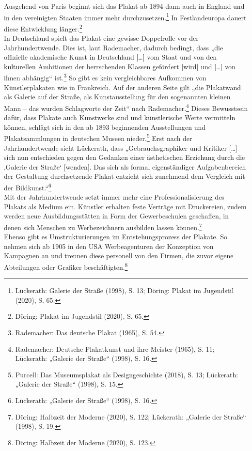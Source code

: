 \documentclass[a4paper,12pt,ngerman]{article}
\begin{document}
Ausgehend von Paris beginnt sich das Plakat ab 1894 dann auch in England und in den vereinigten Staaten immer mehr durchzusetzen.\footnote{Lückerath: Galerie der Straße (1998), S. 13; Döring: Plakat im Jugendstil (2020), S. 65.}  In Festlandeuropa dauert diese Entwicklung länger.\footnote{Döring: Plakat im Jugendstil (2020), S. 65.} \\
In Deutschland spielt das Plakat eine gewisse Doppelrolle vor der Jahrhundertwende. Dies ist, laut Rademacher, dadurch bedingt, dass „die offizielle akademische Kunst in Deutschland […] vom Staat und von den kulturellen Ambitionen der herrschenden Klassen gefördert [wird] und […] von ihnen abhängig“ ist.\footnote{Rademacher: Das deutsche Plakat (1965), S. 54.}  So gibt es kein vergleichbares Aufkommen von Künstlerplakaten wie in Frankreich. Auf der anderen Seite gilt „die Plakatwand als Galerie auf der Straße, als Kunstausstellung für den sogenannten kleinen Mann -- das wurden Schlagworte der Zeit“ nach Rademacher.\footnote{Rademacher: Deutsche Plakatkunst und ihre Meister (1965), S. 11; Lückerath: „Galerie der Straße“ (1998), S. 16.}  Dieses Bewusstsein dafür, dass Plakate auch Kunstwerke sind und künstlerische Werte vermitteln können, schlägt sich in den ab 1893 beginnenden Ausstellungen und Plakatsammlungen in deutschen Museen nieder.\footnote{Purcell: Das Museumsplakat als Designgeschichte (2018), S. 13; Lückerath: „Galerie der Straße“ (1998), S. 15.}  Erst nach der Jahrhundertwende sieht Lückerath, dass „Gebrauchsgraphiker und Kritiker […] sich nun entschieden gegen den Gedanken einer ästhetischen Erziehung durch die ‚Galerie der Straße‘ [wenden]. Das sich als formal eigenständiger Aufgabenbereich der Gestaltung durchsetzende Plakat entzieht sich zunehmend dem Vergleich mit der Bildkunst.“\footnote{Lückerath: „Galerie der Straße“ (1998), S. 16.} \\
Mit der Jahrhundertwende setzt immer mehr eine Professionalisierung des Plakats als Medium ein. Künstler erhalten feste Verträge mit Druckereien, zudem werden neue Ausbildungsstätten in Form der Gewerbeschulen geschaffen, in denen sich Menschen zu Werbezeichnern ausbilden lassen können.\footnote{Döring: Halbzeit der Moderne (2020), S. 122; Lückerath: „Galerie der Straße“ (1998), S. 19.} \\
Ebenso gibt es Umstrukturierungen im Entstehungsprozess der Plakate. So nehmen sich ab 1905 in den USA Werbeagenturen der Konzeption von Kampagnen an und trennen diese personell von den Firmen, die zuvor eigene Abteilungen oder Grafiker beschäftigten.\footnote{Döring: Halbzeit der Moderne (2020), S. 123.} \\
\end{document}
